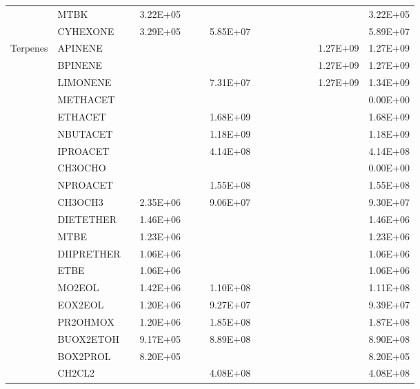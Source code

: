 \begin{longtable}{lllllllllllllll}
	 & MTBK &  & 3.22E+05 &  &  &  &  &  &  &  &  &  &  & 3.22E+05 \\
	 & CYHEXONE &  & 3.29E+05 &  &  & 5.85E+07 &  &  &  &  &  &  &  & 5.89E+07 \\
	\hline \multirow{3}{*}{Terpenes} & APINENE &  &  &  &  &  &  &  &  &  &  &  & 1.27E+09 & 1.27E+09 \\
	 & BPINENE &  &  &  &  &  &  &  &  &  &  &  & 1.27E+09 & 1.27E+09 \\
	 & LIMONENE &  &  &  &  & 7.31E+07 &  &  &  &  &  &  & 1.27E+09 & 1.34E+09 \\
	\hline \parbox[t]{2mm}{} & METHACET &  &  &  &  &  &  &  &  &  &  &  &  & 0.00E+00 \\
	 & ETHACET &  &  &  &  & 1.68E+09 &  &  &  &  &  &  &  & 1.68E+09 \\
	 & NBUTACET &  &  &  &  & 1.18E+09 &  &  &  &  &  &  &  & 1.18E+09 \\
	 & IPROACET &  &  &  &  & 4.14E+08 &  &  &  &  &  &  &  & 4.14E+08 \\
	 & CH3OCHO &  &  &  &  &  &  &  &  &  &  &  &  & 0.00E+00 \\
	 & NPROACET &  &  &  &  & 1.55E+08 &  &  &  &  &  &  &  & 1.55E+08 \\
	\hline \parbox[t]{2mm}{} & CH3OCH3 &  & 2.35E+06 &  &  & 9.06E+07 &  &  &  &  &  &  &  & 9.30E+07 \\*
	 & DIETETHER &  & 1.46E+06 &  &  &  &  &  &  &  &  &  &  & 1.46E+06 \\
	 & MTBE &  & 1.23E+06 &  &  &  &  &  &  &  &  &  &  & 1.23E+06 \\
	 & DIIPRETHER &  & 1.06E+06 &  &  &  &  &  &  &  &  &  &  & 1.06E+06 \\
	 & ETBE &  & 1.06E+06 &  &  &  &  &  &  &  &  &  &  & 1.06E+06 \\
	 & MO2EOL &  & 1.42E+06 &  &  & 1.10E+08 &  &  &  &  &  &  &  & 1.11E+08 \\
	 & EOX2EOL &  & 1.20E+06 &  &  & 9.27E+07 &  &  &  &  &  &  &  & 9.39E+07 \\
	 & PR2OHMOX &  & 1.20E+06 &  &  & 1.85E+08 &  &  &  &  &  &  &  & 1.87E+08 \\
	 & BUOX2ETOH &  & 9.17E+05 &  &  & 8.89E+08 &  &  &  &  &  &  &  & 8.90E+08 \\
	 & BOX2PROL &  & 8.20E+05 &  &  &  &  &  &  &  &  &  &  & 8.20E+05 \\
	\hline \parbox[t]{2mm}{} & CH2CL2 &  &  &  &  & 4.08E+08 &  &  &  &  &  &  &  & 4.08E+08 \\

\end{longtable}
